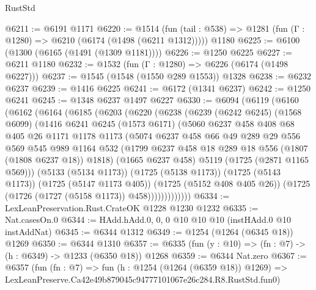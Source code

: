\begin{lexlean}{RustStd}
\begin{coremodule}
@6211 := @6191 @1171
@6220 := @1514
    (fun (tail : @538) => @1281 (fun (Γ : @1280) => @6210 (@6174 (@1498 (@6211 @1312)))))
    @1180
@6225 := @6100 (@1300 (@6165 (@1491 (@1309 @1181))))
@6226 := @1250 @6225
@6227 := @6211 @1180
@6232 := @1532 (fun (Γ : @1280) => @6226 (@6174 (@1498 @6227)))
@6237 := @1545 (@1548 (@1550 @289 @1553)) @1328
@6238 := @6232 @6237
@6239 := @1416 @6225
@6241 := @6172 (@1341 @6237)
@6242 := @1250 @6241
@6245 := @1348 @6237 @1497 @6227
@6330 := @6094
    (@6119
      (@6160
        (@6162
          (@6164
            (@6185
              (@6203
                (@6220
                  (@6238
                    (@6239
                      (@6242 @6245)
                      (@1568 @6099)
                      (@1416
                        @6241
                        @6245
                        (@1573 @6171)
                        (@5060
                          @6237
                          @458
                          @408
                          @68
                          @405
                          @26
                          @1171
                          @1178
                          @1173
                          (@5074
                            @6237
                            @458
                            @66
                            @49
                            @289
                            @29
                            @556
                            @569
                            @545
                            @989
                            @1164
                            @532
                            (@1799 @6237 @458 @18 @289 @18 @556 (@1807 (@1808 @6237 @18)) @1818)
                            (@1665 @6237 @458)
                            @5119
                            (@1725 (@2871 @1165 @569)))
                          (@5133 (@5134 @1173))
                          (@1725 (@5138 @1173))
                          (@1725 (@5143 @1173))
                          (@1725 (@5147 @1173 @405))
                          (@1725 (@5152 @408 @405 @26))
                          (@1725 (@1726 (@1727 (@5158 @1173)) @458)))))))))))))
@6334 := LexLeanPreservation.Rust.CrateOK @1228 @1230 @1232
@6335 := Nat.casesOn.{0}
@6344 := HAdd.hAdd.{0, 0, 0} @10 @10 @10 (instHAdd.{0} @10 instAddNat)
@6345 := @6344 @1312
@6349 := @1254 (@1264 (@6345 @18)) @1269
@6350 := @6344 @1310
@6357 := @6335 (fun (y : @10) => (fn : @7) -> (h : @6349) -> @1233 (@6350 @18)) @1268
@6359 := @6344 Nat.zero
@6367 := @6357
    (fun (fn : @7) =>
    fun (h : @1254 (@1264 (@6359 @18)) @1269) =>
    LexLeanPreserve.Ca42e49b879045c94777101067e26c284.R8.RustStd.fun0)

\end{coremodule}
\end{lexlean}
